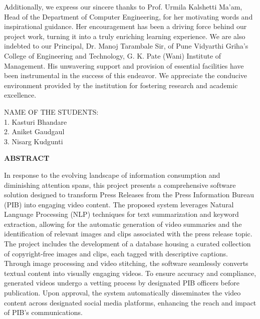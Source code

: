 \documentclass[12pt]{article}
\begin{document}
Additionally, we express our sincere thanks to Prof. Urmila Kalshetti Ma'am, Head of the Department of Computer Engineering, for her motivating words and inspirational guidance. Her encouragement has been a driving force behind our project work, turning it into a truly enriching learning experience.
We are also indebted to our Principal, Dr. Manoj Tarambale Sir, of Pune Vidyarthi Griha’s College of Engineering and Technology, G. K. Pate (Wani) Institute of Management. His unwavering support and provision of essential facilities have been instrumental in the success of this endeavor. We appreciate the conducive environment provided by the institution for fostering research and academic excellence.

\bigskip
\bigskip
\bigskip
\bigskip

\bigskip  
\noindent  
\raggedleft NAME OF THE STUDENTS:  \\
1. Kasturi Bhandare\\
2. Aniket Gaudgaul \\
3. Nisarg Kudgunti  \\


\pagebreak{}

\begin{center} \fontsize{14}{14}\textbf{ABSTRACT }  \end{center}


\justify      
\hspace{5mm}In response to the evolving landscape of information consumption and diminishing attention spans, this project presents a comprehensive software solution designed to transform Press Releases from the Press Information Bureau (PIB) into engaging video content. The proposed system leverages Natural Language Processing (NLP) techniques for text summarization and keyword extraction, allowing for the automatic generation of video summaries and the identification of relevant images and clips associated with the press release topic. \\

The project includes the development of a database housing a curated collection of copyright-free images and clips, each tagged with descriptive captions. Through image processing and video stitching, the software seamlessly converts textual content into visually engaging videos. To ensure accuracy and compliance, generated videos undergo a vetting process by designated PIB officers before publication. Upon approval, the system automatically disseminates the video content across designated social media platforms, enhancing the reach and impact of PIB's communications. \\
\end{document}
